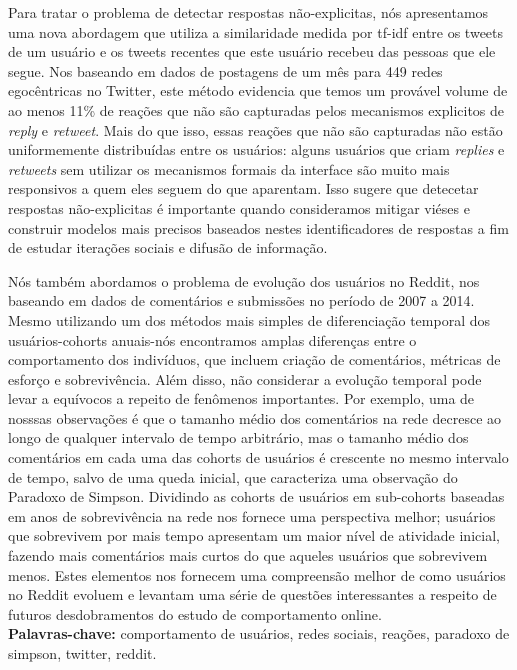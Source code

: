 \documentclass[11pt,twoside,a4paper]{book}
\begin{document}
Para tratar o problema de detectar respostas não-explicitas, nós apresentamos uma nova abordagem que utiliza a similaridade medida por tf-idf entre os tweets de um usuário e os tweets recentes que este usuário recebeu das pessoas que ele segue. Nos baseando em dados de postagens de um mês para 449 redes egocêntricas no Twitter, este método evidencia que temos um provável volume de ao menos 11\% de reações que não são capturadas pelos mecanismos explicitos de \textit{reply} e \textit{retweet}. Mais do que isso, essas reações que não são capturadas não estão uniformemente distribuídas entre os usuários: alguns usuários que criam \textit{replies} e \textit{retweets} sem utilizar os mecanismos formais da interface são muito mais responsivos a quem eles seguem do que aparentam. Isso sugere que detecetar respostas não-explicitas é importante quando consideramos mitigar viéses e construir modelos mais precisos baseados nestes identificadores de respostas a fim de estudar iterações sociais e difusão de informação. 

Nós também abordamos o problema de evolução dos usuários no Reddit, nos baseando em dados de comentários e submissões no período de 2007 a 2014. Mesmo utilizando um dos métodos mais simples de diferenciação temporal dos usuários-cohorts anuais-nós encontramos amplas diferenças entre o comportamento dos indivíduos, que incluem criação de comentários, métricas de esforço e sobrevivência. Além disso, não considerar a evolução temporal pode levar a equívocos a repeito de fenômenos importantes. Por exemplo, uma de nosssas observações é que o tamanho médio dos comentários na rede decresce ao longo de qualquer intervalo de tempo arbitrário, mas o tamanho médio dos comentários em cada uma das cohorts de usuários é crescente no mesmo intervalo de tempo, salvo de uma queda inicial, que caracteriza uma observação do Paradoxo de Simpson. Dividindo as cohorts de usuários em sub-cohorts baseadas em anos de sobrevivência na rede nos fornece uma perspectiva melhor;  usuários que sobrevivem por mais tempo apresentam um maior nível de atividade inicial, fazendo mais comentários mais curtos do que aqueles usuários que sobrevivem menos. Estes elementos nos fornecem uma compreensão melhor de como usuários no Reddit evoluem e levantam uma série de questões interessantes a respeito de futuros desdobramentos do estudo de comportamento online.
\\

\noindent \textbf{Palavras-chave:} comportamento de usuários, redes sociais, reações, paradoxo de simpson, twitter, reddit.
\end{document}
